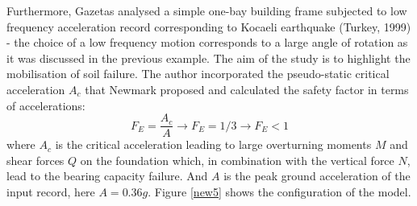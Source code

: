 \documentclass[11pt,a4paper]{report}
\begin{document}
 \newpage
  Furthermore, Gazetas analysed a simple one-bay building frame subjected to low frequency acceleration record corresponding to Kocaeli earthquake (Turkey, 1999) - the choice of a low frequency motion corresponds to a large angle of rotation as it was discussed in the previous example. The aim of the study is to highlight the mobilisation of soil failure. The author incorporated the pseudo-static critical acceleration $A_c$ that Newmark proposed and calculated the safety factor in terms of accelerations:
 \begin{equation}
 F_E= \frac{A_c}{A} \longrightarrow F_E=1/3 \longrightarrow F_E<1
 \end{equation}
 where $A_c$ is the critical acceleration leading to large overturning moments $M$ and shear forces $Q$ on the foundation which, in combination with the vertical force $N$, lead to the bearing capacity failure. And $A$ is the peak ground acceleration of the input record, here $A=0.36g$. Figure \ref{new5} shows the configuration of the model.
 
\end{document}
